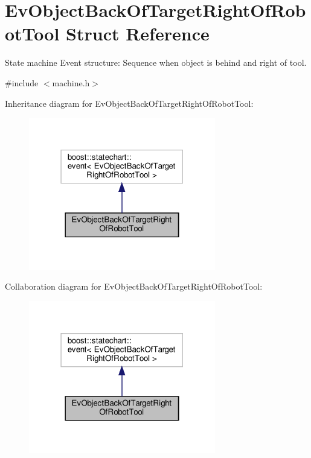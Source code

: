 \hypertarget{structEvObjectBackOfTargetRightOfRobotTool}{}\section{Ev\+Object\+Back\+Of\+Target\+Right\+Of\+Robot\+Tool Struct Reference}
\label{structEvObjectBackOfTargetRightOfRobotTool}


State machine Event structure\+: Sequence when object is behind and right of tool.  




{\ttfamily \#include $<$machine.\+h$>$}



Inheritance diagram for Ev\+Object\+Back\+Of\+Target\+Right\+Of\+Robot\+Tool\+:
\nopagebreak
\begin{figure}[H]
\begin{center}
\leavevmode
\includegraphics[width=231pt]{structEvObjectBackOfTargetRightOfRobotTool__inherit__graph}
\end{center}
\end{figure}


Collaboration diagram for Ev\+Object\+Back\+Of\+Target\+Right\+Of\+Robot\+Tool\+:
\nopagebreak
\begin{figure}[H]
\begin{center}
\leavevmode
\includegraphics[width=231pt]{structEvObjectBackOfTargetRightOfRobotTool__coll__graph}
\end{center}
\end{figure}


